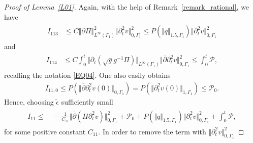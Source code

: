\documentclass[10pt,reqno]{amsart}
\theoremstyle{plain}
\theoremstyle{definition}
\numberwithin{equation}{section}
\newcommand{\ccP}{\mathscr{P}}
\newcommand{\ccPz}{\mathscr{P}_0}
\newcommand{\Ga}{\Gamma}
\newcommand{\norm}[1]{\Vert#1\Vert}
\def\referee#1{{\color{green}\hbox{\bf ~#1~}}} %
\begin{document}
\begin{proof}[Proof of Lemma~\ref{L01}]
Again, with the help of Remark~\ref{remark_rational}, we have
\begin{align}
\begin{split}
I_{113}  &\leq C \norm{\overline{\partial} \Pi }_{L^\infty(\Ga_1)}^2 \norm{\partial^2_t v}^2_{0,\Ga_1}
\leq P(\norm{q}_{1.5,\Ga_1}  ) \norm{\partial^2_t v}_{0,\Ga_1}^2
\end{split}
\nonumber
\end{align}
and
\begin{align}
\begin{split}
I_{114} & \leq C \int_0^t \norm{ \partial_t (\sqrt{g} g^{-1} \Pi )}_{L^\infty(\Ga_1)}
\norm{ \overline{\partial} \partial^2_t v}^2_{0,\Ga_1} 
\leq  \int_0^t \ccP,
\end{split}
\nonumber
\end{align}
recalling the notation \eqref{EQ04}.
One also easily obtains
\begin{gather}
I_{11,0} \leq 
P(\norm{ \overline{\partial} \partial^2_t v(0)}_{0,\Ga_1})
=
P(\norm{ \partial^2_t v(0)}_{1,\Ga_1})
\leq\ccPz.
\nonumber
\end{gather}
Hence, choosing $\widetilde{\epsilon}$ sufficiently small 
\begin{align}
\begin{split}
I_{11}  \leq & \, - \frac{1}{C_{11}} \norm{ \overline{\partial} (\Pi \partial^2_t v)}^2_{0,\Ga_1}
+\ccPz
+P(\norm{q}_{1.5,\Ga_1}) \norm{\partial^2_t v}_{0,\Ga_1}^2
+  \int_0^t \ccP,
\end{split}
\label{estimate_I_11_intermediate}
\end{align}
for some positive constant $C_{11}$.
In order to remove the term with $\norm{\partial^2_t v}_{0,\Ga_1}^2$ 

\end{proof}
\end{document}
